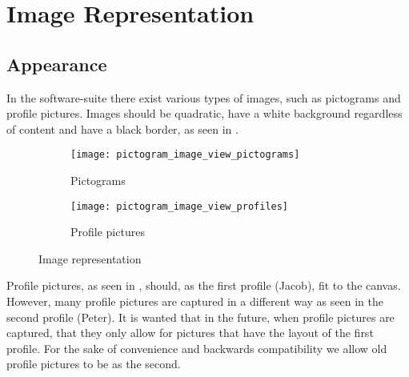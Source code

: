 
\chapter{Image Representation}

\section{Appearance}
\label{sec:appearance}
In the \giraf software-suite there exist various types of images, such as pictograms and profile pictures. Images should be quadratic, have a white background regardless of content and have a black border, as seen in . 



\begin{figure}[!htbp]
    \centering

    \begin{subfigure}[t]{0.4\textwidth}
    	\centering
        \texttt{[image: pictogram\_image\_view\_pictograms]}
        \caption{Pictograms}
        \label{fig:pictogram_image_view_pictograms}
    \end{subfigure}
    \hspace{5em} 
    \begin{subfigure}[t]{0.4\textwidth}
    	\centering
        \texttt{[image: pictogram\_image\_view\_profiles]}
        \caption{Profile pictures}
        \label{fig:pictogram_image_view_profiles}
    \end{subfigure}
    
    \caption{Image representation}
    \label{fig:pictogram_image_view}
\end{figure}

\begin{note}
	Profile pictures, as seen in , should, as the first profile (Jacob), fit to the canvas. However, many profile pictures are captured in a different way as seen in the second profile (Peter). It is wanted that in the future, when profile pictures are captured, that they only allow for pictures that have the layout of the first profile. For the sake of convenience and backwards compatibility we allow old profile pictures to be as the second.
\end{note}

